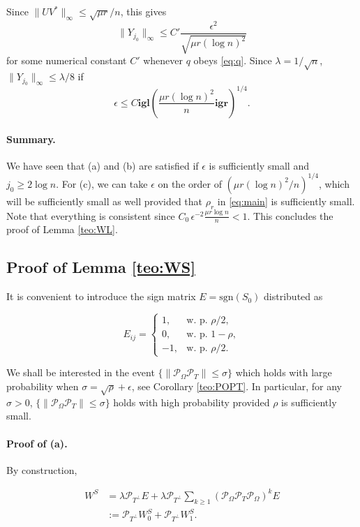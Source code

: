 Since $\|UV^*\|_\infty \le \sqrt{\mu r}/{n}$, this gives
\[
\|Y_{j_0}\|_\infty \le C' \frac{\epsilon^2}{\sqrt{\mu r (\log n)^2}}
\]
for some numerical constant $C'$ whenever $q$ obeys \eqref{eq:q}.
Since $\lambda = 1/\sqrt{n}$, $\|Y_{j_0}\|_\infty \le \lambda/8$ if
\[
\epsilon \le C \mathbf{igl}( \frac{\mu r (\log n)^2}{n} \mathbf{igr})^{1/4}.
\]

\paragraph{Summary.} We have seen that (a) and (b) are satisfied if
$\epsilon$ is sufficiently small and $j_0 \ge 2\log n$. For (c), we can take $\epsilon$ on the order of $(\mu  r (\log n)^2/n)^{1/4}$, which will be sufficiently small as well provided that $\rho_r$ in
\eqref{eq:main} is sufficiently small. Note that everything is consistent since $C_0 \, \epsilon^{-2} \frac{\mu r \log n}{n} < 1$. This concludes the proof of Lemma \ref{teo:WL}.

\subsection{Proof of Lemma \ref{teo:WS}}

It is convenient to introduce the sign matrix $E = \textrm{sgn}(S_0)$
distributed as

\begin{equation}
\label{eq:random-sign}
E_{ij} = \begin{cases} 1, & \text{w.~p. }
  \rho/2,\\
  0, & \text{w.~p. } 1-\rho,\\
  -1, & \text{w.~p. } \rho/2. 
\end{cases} 
\end{equation}

We shall be interested in the event $\{\|\mathcal{P}_{\Omega}\mathcal{P}_T\| \le \sigma\}$ which holds with large probability when $\sigma = \sqrt{\rho} + \epsilon$,
see Corollary \ref{teo:POPT}. In particular, for any $\sigma > 0$,
$\{\|\mathcal{P}_{\Omega}\mathcal{P}_T\| \le \sigma\}$ holds with high probability provided
$\rho$ is sufficiently small. 

\paragraph{Proof of (a).} By construction,

\begin{align*}
  W^S & = \lambda \mathcal{P}_{T^\perp}  E + \lambda \mathcal{P}_{T^\perp} \sum_{k \ge 1}
  (\mathcal{P}_{\Omega}\mathcal{P}_T\mathcal{P}_{\Omega})^k E\\
  & := \mathcal{P}_{T^\perp} W_0^S + \mathcal{P}_{T^\perp} W_1^S.
\end{align*}

